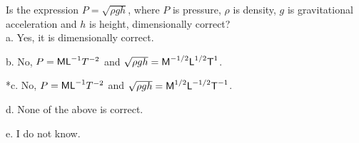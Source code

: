 
Is the expression \(P=\sqrt{\rho gh}\), where \(P\) is pressure, \(\rho\) is density, \(g\) is gravitational acceleration and \(h\) is height, dimensionally correct?\\

a. Yes, it is dimensionally correct.

b. No, $P = \text{\textsf{ML}}^{- 1}T^{- 2}$ and $\sqrt{\rho gh}=\text{\textsf{M}}^{- 1/2}\text{\textsf{L}}^{1/2}\text{\textsf{T}}^{1}$.

*c. No, $P = \text{\textsf{ML}}^{- 1}T^{- 2}$ and $\sqrt{\rho gh}=\text{\textsf{M}}^{1/2}\text{\textsf{L}}^{- 1/2}\text{\textsf{T}}^{- 1}$.

d. None of the above is correct.

e. I do not know.\\
